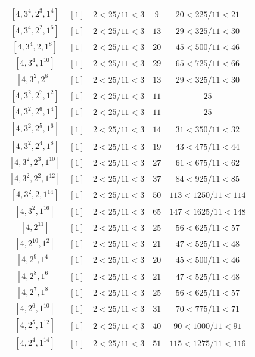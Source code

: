 \documentclass{article}%
\begin{document}
\begin{center}
\begin{longtable}{||c|c|c|c|c||}
$[4, 3^{4}, 2^{3}, 1^{4}]$ & $[1]$ & $2 < 25/11 < 3$ & $9$ & $20 < 225/11 < 21$ \\ \hline 
$[4, 3^{4}, 2^{2}, 1^{6}]$ & $[1]$ & $2 < 25/11 < 3$ & $13$ & $29 < 325/11 < 30$ \\ \hline 
$[4, 3^{4}, 2, 1^{8}]$ & $[1]$ & $2 < 25/11 < 3$ & $20$ & $45 < 500/11 < 46$ \\ \hline 
$[4, 3^{4}, 1^{10}]$ & $[1]$ & $2 < 25/11 < 3$ & $29$ & $65 < 725/11 < 66$ \\ \hline 
$[4, 3^{2}, 2^{8}]$ & $[1]$ & $2 < 25/11 < 3$ & $13$ & $29 < 325/11 < 30$ \\ \hline 
$[4, 3^{2}, 2^{7}, 1^{2}]$ & $[1]$ & $2 < 25/11 < 3$ & $11$ & $25$ \\ \hline 
$[4, 3^{2}, 2^{6}, 1^{4}]$ & $[1]$ & $2 < 25/11 < 3$ & $11$ & $25$ \\ \hline 
$[4, 3^{2}, 2^{5}, 1^{6}]$ & $[1]$ & $2 < 25/11 < 3$ & $14$ & $31 < 350/11 < 32$ \\ \hline 
$[4, 3^{2}, 2^{4}, 1^{8}]$ & $[1]$ & $2 < 25/11 < 3$ & $19$ & $43 < 475/11 < 44$ \\ \hline 
$[4, 3^{2}, 2^{3}, 1^{10}]$ & $[1]$ & $2 < 25/11 < 3$ & $27$ & $61 < 675/11 < 62$ \\ \hline 
$[4, 3^{2}, 2^{2}, 1^{12}]$ & $[1]$ & $2 < 25/11 < 3$ & $37$ & $84 < 925/11 < 85$ \\ \hline 
$[4, 3^{2}, 2, 1^{14}]$ & $[1]$ & $2 < 25/11 < 3$ & $50$ & $113 < 1250/11 < 114$ \\ \hline 
$[4, 3^{2}, 1^{16}]$ & $[1]$ & $2 < 25/11 < 3$ & $65$ & $147 < 1625/11 < 148$ \\ \hline 
$[4, 2^{11}]$ & $[1]$ & $2 < 25/11 < 3$ & $25$ & $56 < 625/11 < 57$ \\ \hline 
$[4, 2^{10}, 1^{2}]$ & $[1]$ & $2 < 25/11 < 3$ & $21$ & $47 < 525/11 < 48$ \\ \hline 
$[4, 2^{9}, 1^{4}]$ & $[1]$ & $2 < 25/11 < 3$ & $20$ & $45 < 500/11 < 46$ \\ \hline 
$[4, 2^{8}, 1^{6}]$ & $[1]$ & $2 < 25/11 < 3$ & $21$ & $47 < 525/11 < 48$ \\ \hline 
$[4, 2^{7}, 1^{8}]$ & $[1]$ & $2 < 25/11 < 3$ & $25$ & $56 < 625/11 < 57$ \\ \hline 
$[4, 2^{6}, 1^{10}]$ & $[1]$ & $2 < 25/11 < 3$ & $31$ & $70 < 775/11 < 71$ \\ \hline 
$[4, 2^{5}, 1^{12}]$ & $[1]$ & $2 < 25/11 < 3$ & $40$ & $90 < 1000/11 < 91$ \\ \hline 
$[4, 2^{4}, 1^{14}]$ & $[1]$ & $2 < 25/11 < 3$ & $51$ & $115 < 1275/11 < 116$ \\ \hline 

\end{longtable}
\end{center}
\end{document}
